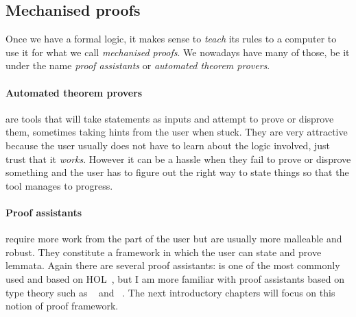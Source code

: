 

\subsection{Mechanised proofs}

Once we have a formal logic, it makes sense to \emph{teach} its rules to a
computer to use it for what we call \emph{mechanised proofs}.
We nowadays have many of those, be it under the name \emph{proof assistants} or
\emph{automated theorem provers}.

\paragraph{Automated theorem provers} are tools that will take statements as
inputs and attempt to prove or disprove them, sometimes taking hints from the
user when stuck.
They are very attractive because the user usually does not have to learn about
the logic involved, just trust that it \emph{works}. However it can be a hassle when they fail to prove or disprove
something and the user has to figure out the right way to state things so that
the tool manages to progress.

\paragraph{Proof assistants} require more work from the part of the user but are
usually more malleable and robust. They constitute a framework in which the user
can state and prove lemmata. Again there are several proof assistants: \IsaHOL
is one of the most commonly used and based on
\acrfull{HOL}~, but I am more  familiar with
proof assistants based on type theory such as \Coq~ and
\Agda~.
The next introductory chapters will focus on this notion of proof framework.

